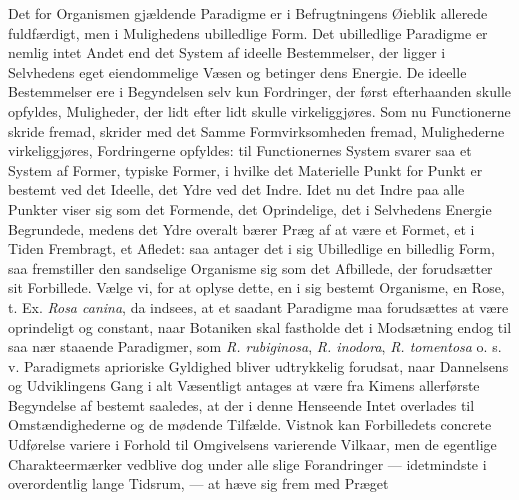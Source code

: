 \documentclass[12pt,a4paper]{book}
\begin{document}
Det for Organismen gjældende Paradigme er i Befrugtningens Øieblik
allerede fuldfærdigt, men i Mulighedens ubilledlige Form. Det ubilledlige
Paradigme er nemlig intet Andet end det System af ideelle Bestemmelser,
der ligger i Selvhedens eget eiendommelige Væsen og betinger dens
Energie. De ideelle Bestemmelser ere i Begyndelsen selv kun Fordringer,
der først efterhaanden skulle opfyldes, Muligheder, der lidt efter lidt
skulle virkeliggjøres. Som nu Functionerne skride fremad, skrider med det
Samme Formvirksomheden fremad, Mulighederne virkeliggjøres, Fordringerne
opfyldes: til Functionernes System svarer saa et System af Former,
typiske Former, i hvilke det Materielle Punkt for Punkt er bestemt ved
det Ideelle, det Ydre ved det Indre. Idet nu det Indre paa alle Punkter
viser sig som det Formende, det Oprindelige, det i Selvhedens Energie
Begrundede, medens det Ydre overalt bærer Præg af at være et Formet, et i
Tiden Frembragt, et Afledet: saa antager det i sig Ubilledlige en
billedlig Form, saa fremstiller den sandselige Organisme sig som det
Afbillede, der forudsætter sit Forbillede. Vælge vi, for at oplyse dette,
en i sig bestemt Organisme, en Rose, t. Ex. \textit{Rosa canina}, da
indsees, at et saadant Paradigme maa forudsættes at være oprindeligt og
constant, naar Botaniken skal fastholde det i Modsætning endog til saa
nær staaende Paradigmer, som \textit{R. rubiginosa}, \textit{R. inodora},
\textit{R. tomentosa} o. s. v. Paradigmets aprioriske Gyldighed bliver
udtrykkelig forudsat, naar Dannelsens og Udviklingens Gang i alt
Væsentligt antages at være fra Kimens allerførste Begyndelse af bestemt
saaledes, at der i denne Henseende Intet overlades til Omstændighederne
og de mødende Tilfælde. Vistnok kan Forbilledets concrete Udførelse
variere i Forhold til Omgivelsens varierende Vilkaar, men de egentlige
Charakteermærker vedblive dog under alle slige Forandringer ---
idetmindste i overordentlig lange Tidsrum, --- at hæve sig frem med
Præget
\end{document}
